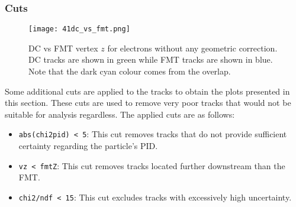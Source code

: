 \subsubsection{Cuts}
\label{12.41::cuts}
    \begin{figure}[b!]
        \texttt{[image: 41dc\_vs\_fmt.png]}
        \caption[DC vs FMT $z$ without geometric correction]
        {DC vs FMT vertex $z$ for electrons without any geometric correction.
        DC tracks are shown in green while FMT tracks are shown in blue.
        Note that the dark cyan colour comes from the overlap.}
        \label{fig::12.41::dc_vs_fmt_vz_11983}
    \end{figure}

    Some additional cuts are applied to the tracks to obtain the plots presented in this section.
    These cuts are used to remove very poor tracks that would not be suitable for analysis regardless.
    The applied cuts are as follows:
    \begin{itemize}
        \item
            \texttt{abs(chi2pid) < 5}:
            This cut removes tracks that do not provide sufficient certainty regarding the particle's PID.
        \item
            \texttt{vz < fmtZ}:
            This cut removes tracks located further downstream than the FMT.
        \item
            \texttt{chi2/ndf < 15}:
            This cut excludes tracks with excessively high uncertainty.
    \end{itemize}
